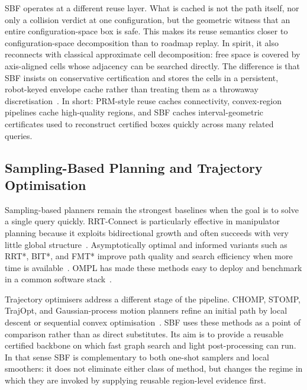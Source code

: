 \documentclass[journal]{IEEEtran}
\begin{document}
SBF operates at a different reuse layer. What is cached is not the path itself,
nor only a collision verdict at one configuration, but the geometric witness
that an entire configuration-space box is safe. This makes its reuse semantics
closer to configuration-space decomposition than to roadmap replay. In spirit,
it also reconnects with classical approximate cell decomposition: free space is
covered by axis-aligned cells whose adjacency can be searched directly.
The difference is that SBF insists on conservative certification and stores the
cells in a persistent, robot-keyed envelope cache rather than treating them as a
throwaway discretisation~\cite{lozanoperez1983spatial,brooks1985subdivision}.
In short: PRM-style reuse caches connectivity, convex-region pipelines cache
high-quality regions, and SBF caches interval-geometric certificates used to
reconstruct certified boxes quickly across many related queries.

\subsection{Sampling-Based Planning and Trajectory Optimisation}

Sampling-based planners remain the strongest baselines when the goal is to solve
a single query quickly. RRT-Connect is particularly effective in manipulator
planning because it exploits bidirectional growth and often succeeds with very
little global structure~\cite{kuffner2000rrt}. Asymptotically optimal and
informed variants such as RRT*, BIT*, and FMT* improve path quality and search
efficiency when more time is available~\cite{karaman2011sampling,
gammell2015batch,gammell2018informed,janson2015fmt}. OMPL has made these
methods easy to deploy and benchmark in a common software stack~\cite{sucan2012ompl,
moll2015benchmarking}.

Trajectory optimisers address a different stage of the pipeline. CHOMP, STOMP,
TrajOpt, and Gaussian-process motion planners refine an initial path by local
descent or sequential convex optimisation~\cite{ratliff2009chomp,
kalakrishnan2011stomp,schulman2014motion,mukadam2018gpmp2}. SBF uses these
methods as a point of comparison rather than as direct substitutes. Its aim is
to provide a reusable certified backbone on which fast graph search and light
post-processing can run. In that sense SBF is complementary to both one-shot
samplers and local smoothers: it does not eliminate either class of method, but
changes the regime in which they are invoked by supplying reusable region-level
evidence first.
\end{document}
